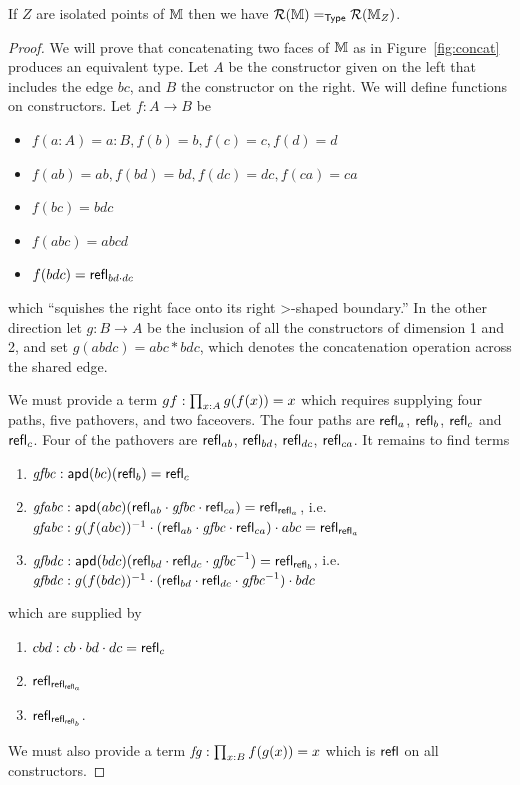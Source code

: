 \begin{mylemma}
If \( Z \) are isolated points of \( \mathbb{M} \) then we have \( \mathcal{R}(\mathbb{M})=_{\mathsf{Type}}\mathcal{R}(\mathbb{M}_Z) \).
\end{mylemma}
\begin{proof}
We will prove that concatenating two faces of \( \mathbb{M} \) as in Figure~\ref{fig:concat} produces an equivalent type. Let \( A \) be the constructor given on the left that includes the edge \( bc \), and \( B \) the constructor on the right. We will define functions on constructors. Let \( f:A\to B \) be
\begin{itemize}
\item \( f(a:A)=a:B, f(b)=b, f(c)=c, f(d)=d \)
\item \( f(ab)=ab, f(bd)=bd, f(dc)=dc, f(ca)=ca \)
\item \( f(bc)=bdc \)
\item \( f(abc)=abcd \)
\item \( f(bdc)=\mathsf{refl}_{bd\cdot dc} \)
\end{itemize} 
which ``squishes the right face onto its right >-shaped boundary.'' In the other direction let \( g:B\to A \) be the inclusion of all the constructors of dimension 1 and 2, and set \( g(abdc)=abc*bdc \), which denotes the concatenation operation across the shared edge.

We must provide a term \( gf:\prod_{x:A}g(f(x))=x \) which requires supplying four paths, five pathovers, and two faceovers. The four paths are \( \mathsf{refl}_a \), \( \mathsf{refl}_b \), \( \mathsf{refl}_c \) and \( \mathsf{refl}_c \). Four of the pathovers are \( \mathsf{refl}_{ab} \), \( \mathsf{refl}_{bd} \), \( \mathsf{refl}_{dc} \), \( \mathsf{refl}_{ca} \). It remains to find terms 
\begin{enumerate}
\item \( \mathit{gfbc}:\mathsf{apd}(bc)(\mathsf{refl}_b)=\mathsf{refl}_c \)
\item \( \mathit{gfabc}:\mathsf{apd}(abc)(\mathsf{refl}_{ab}\cdot \mathit{gfbc}\cdot \mathsf{refl}_{ca})=\mathsf{refl}_{\mathsf{refl}_a} \), i.e. \( \mathit{gfabc}:g(f(abc))^{-1}\cdot  (\mathsf{refl}_{ab}\cdot \mathit{gfbc}\cdot \mathsf{refl}_{ca})\cdot abc = \mathsf{refl}_{\mathsf{refl}_a} \)
\item \( \mathit{gfbdc}:\mathsf{apd}(bdc)(\mathsf{refl}_{bd}\cdot \mathsf{refl}_{dc}\cdot \mathit{gfbc}^{-1})=\mathsf{refl}_{\mathsf{refl}_b} \), i.e. \( \mathit{gfbdc}:g(f(bdc))^{-1}\cdot (\mathsf{refl}_{bd}\cdot \mathsf{refl}_{dc}\cdot \mathit{gfbc}^{-1})\cdot bdc \)
\end{enumerate}
which are supplied by
\begin{enumerate}
\item \( cbd:cb\cdot bd\cdot dc=\mathsf{refl}_c \)
\item \( \mathsf{refl}_{\mathsf{refl}_{\mathsf{refl}_a}}\)
\item \( \mathsf{refl}_{\mathsf{refl}_{\mathsf{refl}_b}}\).
\end{enumerate}

We must also provide a term \( \mathit{fg}:\prod_{x:B}f(g(x))=x \) which is \( \mathsf{refl} \) on all constructors.
\end{proof}
